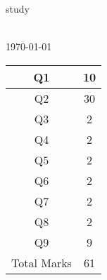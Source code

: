\documentclass[10pt]{article}
\begin{document}
\sloppy
\vspace*{2cm}
\begin{center}
\huge{study}\\
\\\vspace*{2cm}
\date[\today
\\\vspace*{2 cm}
\begin{tabular}{|c|c|}
\hline Q1 & 10 \\ \hline Q2 & 30 \\ \hline Q3 & 2 \\ \hline Q4 & 2 \\ \hline Q5 & 2 \\ \hline Q6 & 2 \\ \hline Q7 & 2 \\ \hline Q8 & 2 \\ \hline Q9 & 9 \\ \hline Total Marks & 61 & \\
\hline \end{tabular}\end{center}
\end{document}
